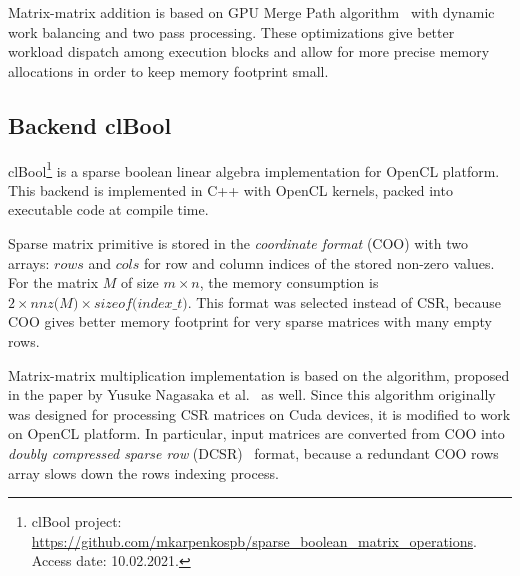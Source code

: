 Matrix-matrix addition is based on GPU Merge Path algorithm~\cite{inproceedings:gpu_merge_path} with dynamic work balancing and two pass processing.
These optimizations give better workload dispatch among execution blocks and allow for more precise memory allocations in order to keep memory footprint small.


\subsection{Backend clBool}

clBool\footnote{clBool project: \url{https://github.com/mkarpenkospb/sparse_boolean_matrix_operations}. Access date: 10.02.2021.} 
is a sparse boolean linear algebra implementation for OpenCL platform.
This backend is implemented in C++ with OpenCL kernels, packed into executable code at compile time. 

Sparse matrix primitive is stored in the \textit{coordinate format} (COO) with two arrays: $rows$ and $cols$ for row and column indices of the stored non-zero values.
For the matrix $M$ of size $m \times n$, the memory consumption is $2 \times \textit{nnz(M)} \times \textit{sizeof(index\_t)}$.
This format was selected instead of CSR, because COO gives better memory footprint for very sparse matrices with many empty rows.


Matrix-matrix multiplication implementation is based on the algorithm, proposed in the paper by Yusuke Nagasaka et al.~\cite{algo:spgemm:8025284} as well. 
Since this algorithm originally was designed for processing CSR matrices on Cuda devices, 
it is modified to work on OpenCL platform.
In particular, input matrices are converted from COO into \textit{doubly compressed sparse row} (DCSR)~\cite{4536313:about:dcsr} format,
because a redundant COO rows array slows down the rows indexing process. 

